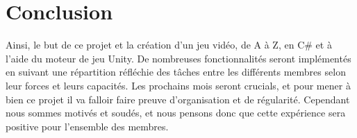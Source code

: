 \section{Conclusion}

Ainsi, le but de ce projet et la création d'un jeu vidéo, de A à Z, en C\# et à l'aide du moteur de jeu Unity. 
De nombreuses fonctionnalités seront implémentés en suivant une répartition réfléchie des tâches entre les différents 
membres selon leur forces et leurs capacités. Les prochains mois seront crucials, et pour mener à bien ce projet il va 
falloir faire preuve d'organisation et de régularité. Cependant nous sommes motivés et soudés, 
et nous pensons donc que cette expérience sera positive pour l'ensemble des membres.